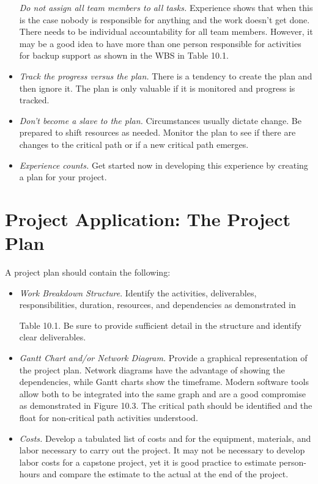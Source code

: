 \begin{itemize}
  \emph{Do not assign all team members to all tasks.} Experience shows
  that when this is the case nobody is responsible for anything and the
  work doesn't get done. There needs to be individual accountability for
  all team members. However, it may be a good idea to have more than one
  person responsible for activities for backup support as shown in the
  WBS in Table 10.1.
\item
  \emph{Track the progress versus the plan.} There is a tendency to
  create the plan and then ignore it. The plan is only valuable if it is
  monitored and progress is tracked.
\item
  \emph{Don't become a slave to the plan.} Circumstances usually dictate
  change. Be prepared to shift resources as needed. Monitor the plan to
  see if there are changes to the critical path or if a new critical
  path emerges.
\item
  \emph{Experience counts.} Get started now in developing this
  experience by creating a plan for your project.
\end{itemize}

\section{Project Application: The Project Plan}
\label{section:project-application-the-project-plan}

A project plan should contain the following:

\begin{itemize}
\item
  \emph{Work Breakdown Structure}. Identify the activities,
  deliverables, responsibilities, duration, resources, and dependencies
  as demonstrated in 

Table 10.1. Be sure to provide sufficient detail in
  the structure and identify clear deliverables.
\item
  \emph{Gantt Chart and/or Network Diagram.} Provide a graphical
  representation of the project plan. Network diagrams have the
  advantage of showing the dependencies, while Gantt charts show the
  timeframe. Modern software tools allow both to be integrated into the
  same graph and are a good compromise as demonstrated in Figure 10.3.
  The critical path should be identified and the float for non-critical
  path activities understood.
\item
  \emph{Costs.} Develop a tabulated list of costs and for the equipment,
  materials, and labor necessary to carry out the project. It may not be
  necessary to develop labor costs for a capstone project, yet it is
  good practice to estimate person-hours and compare the estimate to the
  actual at the end of the project.
\end{itemize}

